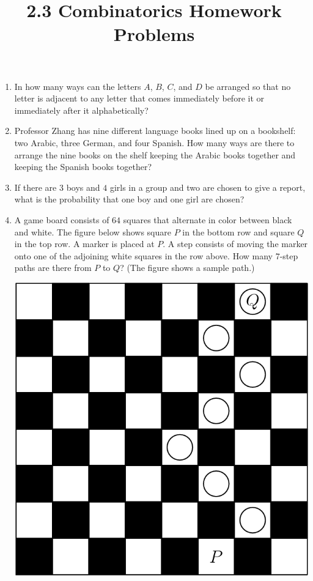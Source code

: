 \documentclass{article}
\title{2.3 Combinatorics Homework Problems}
\author{}
\date{}
\begin{document}
\maketitle

\begin{enumerate}
    \item In how many ways can the letters $A$, $B$, $C$, and $D$ be arranged so that no letter is adjacent to any letter that comes immediately before it or immediately after it alphabetically?
        \vspace{3cm}
    \item Professor Zhang has nine different language books lined up on a bookshelf: two Arabic, three German, and four Spanish.
        How many ways are there to arrange the nine books on the shelf keeping the Arabic books together and keeping the Spanish books together?
        \vspace{3cm}
    \item If there are $3$ boys and $4$ girls in a group and two are chosen to give a report, what is the probability that one boy and one girl are chosen?
        \vspace{3cm}
    \item A game board consists of $64$ squares that alternate in color between black and white.
        The figure below shows square $P$ in the bottom row and square $Q$ in the top row.
        A marker is placed at $P$.
        A step consists of moving the marker onto one of the adjoining white squares in the row above.
        How many $7$-step paths are there from $P$ to $Q$?
        (The figure shows a sample path.)
        \begin{center}
            \includegraphics[scale=0.25]{checker-board.png}
        \end{center}
        \vspace{3cm}
\end{enumerate}
\end{document}
